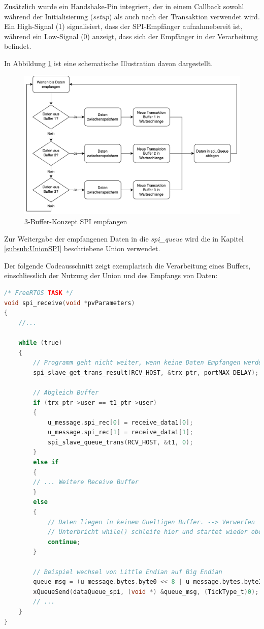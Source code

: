 Zusätzlich wurde ein Handshake-Pin integriert, der in einem Callback sowohl während der Initialisierung (\textit{setup}) als auch nach der Transaktion verwendet wird. Ein High-Signal (1) signalisiert, dass der SPI-Empfänger aufnahmebereit ist, während ein Low-Signal (0) anzeigt, dass sich der Empfänger in der Verarbeitung befindet.

In Abbildung \ref{fig:3BuffKonz} ist eine schematische Illustration davon dargestellt. 

\begin{figure}[H]
    \centering
    \includegraphics[width=0.75\linewidth]{Figures/Chap3/ESP/SPI_RECEIVE/Bufferkonzept_BLE.png}
    \caption{3-Buffer-Konzept SPI empfangen}
    \label{fig:3BuffKonz}
\end{figure}

Zur Weitergabe der empfangenen Daten in die \textit{spi\_queue} wird die in Kapitel \ref{subsub:UnionSPI} beschriebene Union verwendet.

Der folgende Codeausschnitt zeigt exemplarisch die Verarbeitung eines Buffers, einschliesslich der Nutzung der Union und des Empfangs von Daten:

\begin{lstlisting}[language=C]
/* FreeRTOS TASK */
void spi_receive(void *pvParameters)
{
    //...
    
    while (true)
    {
        // Programm geht nicht weiter, wenn keine Daten Empfangen werden.
        spi_slave_get_trans_result(RCV_HOST, &trx_ptr, portMAX_DELAY);

        // Abgleich Buffer
        if (trx_ptr->user == t1_ptr->user)
        {
            u_message.spi_rec[0] = receive_data1[0];
            u_message.spi_rec[1] = receive_data1[1];
            spi_slave_queue_trans(RCV_HOST, &t1, 0);
        } 
        else if
        {
        // ... Weitere Receive Buffer
        }
        else
        {
            // Daten liegen in keinem Gueltigen Buffer. --> Verwerfen
            // Unterbricht while() schleife hier und startet wieder oben
            continue;
        }
        
        // Beispiel wechsel von Little Endian auf Big Endian
        queue_msg = (u_message.bytes.byte0 << 8 | u_message.bytes.byte1);
        xQueueSend(dataQueue_spi, (void *) &queue_msg, (TickType_t)0);
        // ...
    }
}
        
\end{lstlisting}



